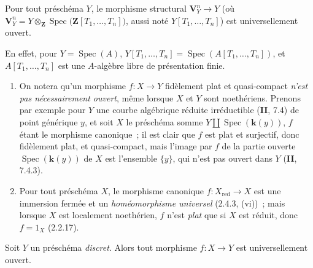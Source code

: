 \begin{corollary}[2.4.7]
\label{IV.2.4.7-fr}
Pour tout préschéma $Y$, le morphisme structural $\mathbf V_Y^n\to Y$ \textup{(où}
$\mathbf V_Y^n
=Y\otimes_{\mathbf Z}\operatorname{Spec}
  \bigl(\mathbf Z[T_1,\ldots,T_n]\bigr)$,
\textup{aussi noté $Y[T_1,\ldots,T_n]$)} est universellement ouvert.
\end{corollary}

En effet, pour $Y=\operatorname{Spec}(A)$,
$Y[T_1,\ldots,T_n]=\operatorname{Spec}(A[T_1,\ldots,T_n])$, et
$A[T_1,\ldots,T_n]$ est une $A$-algèbre libre de présentation finie.

\begin{remarks}[2.4.8]
\label{IV.2.4.8-fr}
\begin{enumerate}
\item[(i)] On notera qu'un morphisme $f:X\to Y$ fidèlement plat et
quasi-compact \emph{n'est pas nécessairement ouvert}, même lorsque $X$ et $Y$
sont noethériens. Prenons par exemple pour $Y$ une courbe algébrique réduite
irréductible (\textbf{II}, 7.4) de point générique $y$, et soit $X$ le préschéma somme
$Y\amalg\operatorname{Spec}(\boldsymbol{k}(y))$, $f$ étant le morphisme canonique~; il est
clair que $f$ est plat et surjectif, donc fidèlement plat, et quasi-compact,
mais l'image par $f$ de la partie ouverte $\operatorname{Spec}(\boldsymbol{k}(y))$ de $X$
est l'ensemble $\{y\}$, qui n'est pas ouvert dans $Y$ (\textbf{II}, 7.4.3).
\item[(ii)] Pour tout préschéma $X$, le morphisme canonique
$f:X_{\mathrm{red}}\to X$ est une immersion fermée et un
\emph{homéomorphisme universel} (2.4.3, (vi))~; mais lorsque $X$ est
localement noethérien, $f$ n'est \emph{plat} que si $X$ est réduit, donc
$f=1_X$ (2.2.17).
\end{enumerate}
\end{remarks}

\begin{proposition}[2.4.9]
\label{IV.2.4.9-fr}
Soit $Y$ un préschéma \emph{discret}. Alors tout morphisme $f:X\to Y$ est
universellement ouvert.
\end{proposition}

